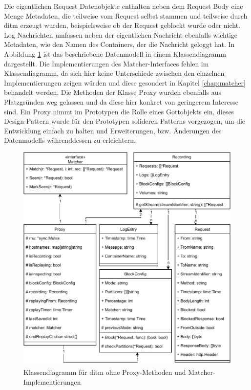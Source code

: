 \documentclass[12pt,a4paper]{report}
\begin{document}
Die eigentlichen Request Datenobjekte enthalten neben dem Request Body eine Menge Metadaten, die teilweise vom Request selbst
stammen und teilweise durch ditm erzeugt wurden, beispielsweise ob der Request geblockt wurde oder nicht.
Log Nachrichten umfassen neben der eigentlichen Nachricht ebenfalls wichtige Metadaten, wie den Namen des Containers, der die
Nachricht geloggt hat. In Abbildung \ref{fig:class} ist das beschriebene Datenmodell in einem Klassendiagramm dargestellt. Die
Implementierungen des Matcher-Interfaces fehlen im Klassendiagramm, da sich hier keine Unterschiede zwischen den einzelnen
Implementierungen zeigen würden und diese gesondert in Kapitel \ref{chap:matcher} behandelt werden. Die Methoden der Klasse Proxy wurden
ebenfalls aus Platzgründen weg gelassen und da diese hier konkret von geringerem Interesse sind. Ein Proxy nimmt im Prototypen die
Rolle eines Gottobjekts ein, dieses Design-Pattern wurde für den Prototypen solideren Patterns vorgezogen, um die Entwicklung
einfach zu halten und Erweiterungen, bzw. Änderungen des Datenmodells währenddessen zu erleichtern.
\begin{figure}[H]
	\centering
	\includegraphics[width=\linewidth]{img/ditm-Class.pdf}
	\caption{Klassendiagramm für ditm ohne Proxy-Methoden und Matcher-Implementierungen}
	\label{fig:class}
\end{figure}
\end{document}
